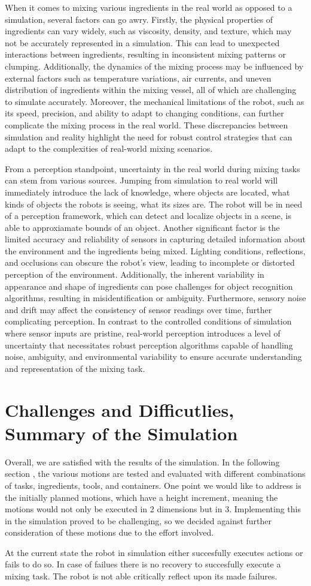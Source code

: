 When it comes to mixing various ingredients in the real world as opposed to a simulation, several factors can go awry. Firstly, the physical properties of ingredients can vary widely, such as viscosity, density, and texture, which may not be accurately represented in a simulation.
This can lead to unexpected interactions between ingredients, resulting in inconsistent mixing patterns or clumping. Additionally, the dynamics of the mixing process may be influenced by external factors such as temperature variations, air currents, and uneven distribution of ingredients within the mixing vessel, all of which are challenging to simulate accurately.
Moreover, the mechanical limitations of the robot, such as its speed, precision, and ability to adapt to changing conditions, can further complicate the mixing process in the real world.
These discrepancies between simulation and reality highlight the need for robust control strategies that can adapt to the complexities of real-world mixing scenarios.

From a perception standpoint, uncertainty in the real world during mixing tasks can stem from various sources.
Jumping from simulation to real world will immediately introduce the lack of knowledge, where objects are located, what kinds of objects
the robots is seeing, what its sizes are. The robot will be in need of a perception framework, which can detect and localize objects in a scene,
is able to approxiamate bounds of an object.
Another significant factor is the limited accuracy and reliability of sensors in capturing detailed information about the environment and the ingredients being mixed.
Lighting conditions, reflections, and occlusions can obscure the robot's view, leading to incomplete or distorted perception of the environment.
Additionally, the inherent variability in appearance and shape of ingredients can pose challenges for object recognition algorithms, resulting in misidentification or ambiguity.
Furthermore, sensory noise and drift may affect the consistency of sensor readings over time, further complicating perception.
In contrast to the controlled conditions of simulation where sensor inputs are pristine, real-world perception introduces a level of uncertainty that necessitates robust perception algorithms capable of handling noise, ambiguity, and environmental variability to ensure accurate understanding and representation of the mixing task.


\section{Challenges and Difficutlies, Summary of the Simulation}
Overall, we are satisfied with the results of the simulation. In the following section , the various motions are tested and evaluated with different combinations of tasks, ingredients, tools, and containers. One point we would like to address is the initially planned motions, which have a height increment, meaning the motions would not only be executed in 2 dimensions but in 3. Implementing this in the simulation proved to be challenging, so we decided against further consideration of these motions due to the effort involved.

At the current state the robot in simulation either succesfully executes actions or fails to do so.
In case of failues there is no recovery to succesfully execute a mixing task. The robot is not able critically
reflect upon its made failures.
